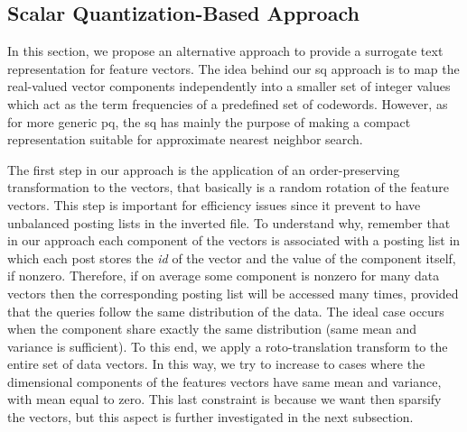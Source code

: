 \subsection{Scalar Quantization-Based Approach}
\label{subsec:str:sq}
In this section, we propose an alternative approach to provide a surrogate text representation for feature vectors.
The idea behind our \acrfull{sq} approach is to map the real-valued vector components independently into a smaller set of integer values which act as the term frequencies of a predefined set of codewords.
However, as for more generic \gls{pq}, the \gls{sq} has mainly the purpose of making a compact representation suitable for approximate nearest neighbor search.

The first step in our approach is the application of an order-preserving transformation to the vectors, that basically is a random rotation of the feature vectors.
This step is important for efficiency issues since it prevent to have unbalanced posting lists in the inverted file.
To understand why, remember that in our approach each component of the vectors is associated with a posting list in which each post stores the \emph{id} of the vector and the value of the component itself, if nonzero.
Therefore, if on average some component is nonzero for many data vectors then the corresponding posting list will be accessed many times, provided that the queries follow the same distribution of the data.
The ideal case occurs when the component share exactly the same distribution (same mean and variance is sufficient).
To this end, we apply a roto-translation transform to the entire set of data vectors.
In this way, we try to increase to cases where the dimensional components of the features vectors have same mean and variance, with mean equal to zero.
This last constraint is because we want then sparsify the vectors, but this aspect is further investigated in the next subsection.

